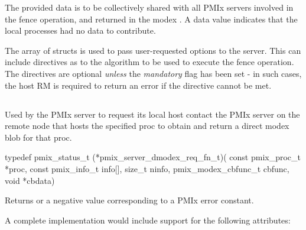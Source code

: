 The provided data is to be collectively shared with all PMIx servers involved in the fence operation, and returned in the modex .
A  data value indicates that the local processes had no data to contribute.

The array of  structs is used to pass user-requested options to the server.
This can include directives as to the algorithm to be used to execute the fence operation.
The directives are optional \emph{unless} the \emph{mandatory} flag has been set - in such cases, the host \ac{RM} is required to return an error if the directive cannot be met.


\subsection{}

\summary

Used by the PMIx server to request its local host contact the PMIx server on the remote node that hosts the specified proc to obtain and return a direct modex blob for that proc.

\format

\cspecificstart
\begin{codepar}
typedef pmix_status_t (*pmix_server_dmodex_req_fn_t)(
                             const pmix_proc_t *proc,
                             const pmix_info_t info[], size_t ninfo,
                             pmix_modex_cbfunc_t cbfunc, void *cbdata)
\end{codepar}
\cspecificend

\begin{arglist}
\end{arglist}

Returns  or a negative value corresponding to a PMIx error constant.

\optattr
A complete implementation would include support for the following attributes:


\descr

